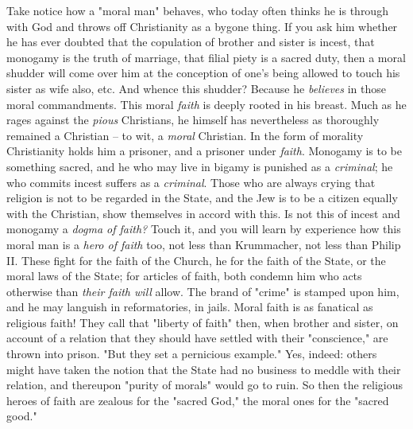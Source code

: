 \documentclass[a4paper]{book}
\begin{document}
Take notice how a "{}moral man"{} behaves, who today often thinks he is 
through with God and throws off Christianity as a bygone thing. If you ask him 
whether he has ever doubted that the copulation of brother and sister is 
incest, that monogamy is the truth of marriage, that filial piety is a sacred 
duty, then a moral shudder will come over him at the conception of one's being 
allowed to touch his sister as wife also, etc. And whence this shudder? 
Because he \textit{believes} in those moral commandments. This moral 
\textit{faith} is deeply rooted in his breast. Much as he rages against the 
\textit{pious} Christians, he himself has nevertheless as thoroughly remained 
a Christian -- to wit, a \textit{moral} Christian. In the form of morality 
Christianity holds him a prisoner, and a prisoner under \textit{faith}. 
Monogamy is to be something sacred, and he who may live in bigamy is punished 
as a \textit{criminal}; he who commits incest suffers as a \textit{criminal}. 
Those who are always crying that religion is not to be regarded in the State, 
and the Jew is to be a citizen equally with the Christian, show themselves in 
accord with this. Is not this of incest and monogamy a \textit{dogma of 
faith?} Touch it, and you will learn by experience how this moral man is a 
\textit{hero of faith} too, not less than Krummacher, not less than Philip II. 
These fight for the faith of the Church, he for the faith of the State, or the 
moral laws of the State; for articles of faith, both condemn him who acts 
otherwise than \textit{their faith will} allow. The brand of "{}crime"{} is 
stamped upon him, and he may languish in reformatories, in jails. Moral faith 
is as fanatical as religious faith! They call that "{}liberty of faith"{} 
then, when brother and sister, on account of a relation that they should have 
settled with their "{}conscience,"{} are thrown into prison. "{}But they set a 
pernicious example."{} Yes, indeed: others might have taken the notion that 
the State had no business to meddle with their relation, and thereupon 
"{}purity of morals"{} would go to ruin. So then the religious heroes of faith 
are zealous for the "{}sacred God,"{} the moral ones for the "{}sacred 
good."{}
\end{document}
